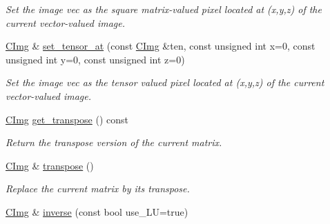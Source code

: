 \begin{DoxyCompactItemize}
\begin{DoxyCompactList}\small\item\em Set the image {\ttfamily vec} as the {\itshape square\/} {\itshape matrix-\/valued\/} pixel located at ({\ttfamily x},{\ttfamily y},{\ttfamily z}) of the current vector-\/valued image. \item\end{DoxyCompactList}\item 
\hypertarget{structcimg__library_1_1_c_img_ac199c9b30cc745b03c5f9bf3a1c4e7d4}{
\hyperlink{structcimg__library_1_1_c_img}{CImg} \& \hyperlink{structcimg__library_1_1_c_img_ac199c9b30cc745b03c5f9bf3a1c4e7d4}{set\_\-tensor\_\-at} (const \hyperlink{structcimg__library_1_1_c_img}{CImg} \&ten, const unsigned int x=0, const unsigned int y=0, const unsigned int z=0)}
\label{structcimg__library_1_1_c_img_ac199c9b30cc745b03c5f9bf3a1c4e7d4}

\begin{DoxyCompactList}\small\item\em Set the image {\ttfamily vec} as the {\itshape tensor\/} {\itshape valued\/} pixel located at ({\ttfamily x},{\ttfamily y},{\ttfamily z}) of the current vector-\/valued image. \item\end{DoxyCompactList}\item 
\hypertarget{structcimg__library_1_1_c_img_ab8737309377bbea23ea4c44f3f2a2187}{
\hyperlink{structcimg__library_1_1_c_img}{CImg} \hyperlink{structcimg__library_1_1_c_img_ab8737309377bbea23ea4c44f3f2a2187}{get\_\-transpose} () const }
\label{structcimg__library_1_1_c_img_ab8737309377bbea23ea4c44f3f2a2187}

\begin{DoxyCompactList}\small\item\em Return the transpose version of the current matrix. \item\end{DoxyCompactList}\item 
\hypertarget{structcimg__library_1_1_c_img_aedfbb8bbd5a2699fe23834fcc4af42e1}{
\hyperlink{structcimg__library_1_1_c_img}{CImg} \& \hyperlink{structcimg__library_1_1_c_img_aedfbb8bbd5a2699fe23834fcc4af42e1}{transpose} ()}
\label{structcimg__library_1_1_c_img_aedfbb8bbd5a2699fe23834fcc4af42e1}

\begin{DoxyCompactList}\small\item\em Replace the current matrix by its transpose. \item\end{DoxyCompactList}\item 
\hypertarget{structcimg__library_1_1_c_img_abaeeed53c26e52bb8f518242df202267}{
\hyperlink{structcimg__library_1_1_c_img}{CImg} \& \hyperlink{structcimg__library_1_1_c_img_abaeeed53c26e52bb8f518242df202267}{inverse} (const bool use\_\-LU=true)}
\label{structcimg__library_1_1_c_img_abaeeed53c26e52bb8f518242df202267}


\end{DoxyCompactItemize}
